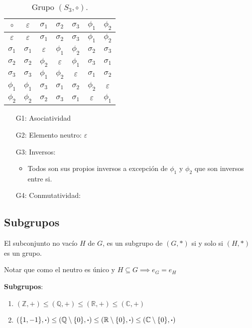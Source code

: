 \begin{table}[H]
	\centering
	\begin{tabular}{c|cccccc}
		$\circ$ & $\varepsilon$ & $\sigma_1$ & $\sigma_2$ & $\sigma_3$ & $\phi_1$ & $\phi_2$ \\ \hline
		$\varepsilon$ & $\varepsilon$ & $\sigma_1$ & $\sigma_2$ & $\sigma_3$ & $\phi_1$ & $\phi_2$ \\
		$\sigma_1$ & $\sigma_1$ & $\varepsilon$ & $\phi_1$ & $\phi_2$ & $\sigma_2$ & $\sigma_3$ \\
		$\sigma_2$ & $\sigma_2$ & $\phi_2$ & $\varepsilon$ & $\phi_1$ & $\sigma_3$ & $\sigma_1$\\
		$\sigma_3$ & $\sigma_3$ & $\phi_1$ & $\phi_2$ & $\varepsilon$ & $\sigma_1$ & $\sigma_2$\\
		$\phi_1$ & $\phi_1$ & $\sigma_3$ & $\sigma_1$ & $\sigma_2$ & $\phi_2$ & $\varepsilon$\\
		$\phi_2$ & $\phi_2$ & $\sigma_2$ & $\sigma_3$ & $\sigma_1$ & $\varepsilon$ & $\phi_1$\\
	\end{tabular}
	\caption{Grupo $(S_3, \circ)$.}
	\label{tab:compos}
\end{table}

\begin{itemize}
	\item[G1:] Asociatividad \cmark
	\item[G2:] Elemento neutro: $\varepsilon$ \cmark
	\item[G3:] Inversos: \cmark
	\begin{itemize}
		\item Todos son sus propios inversos a excepción de $\phi_1$ y $\phi_2$ que son inversos entre si.
	\end{itemize}
	\item[G4:] Conmutatividad: \xmark
\end{itemize}

\subsection{Subgrupos} \label{sec:subgrupo}
\vspace{3mm}	
	\begin{fmd-definition}[Subgrupo]
		El subconjunto no vacío $H$ de $G$, es un subgrupo de $(G, *)$ si y solo si $(H, *)$ es un grupo.
	\end{fmd-definition}
	Notar que como el neutro es único y $H \subseteq G \implies e_G = e_H$
	
	\textbf{Subgrupos}:
	\begin{enumerate}
		\item $(\mathbb{Z}, +) \le (\mathbb{Q}, +) \le (\mathbb{R}, +) \le (\mathbb{C}, +)$
		\item $\left( \{1, -1 \}, \boldsymbol{\cdot} \right) \le \left( \mathbb{Q} \setminus \{0\}, \boldsymbol{\cdot} \right) \le \left( \mathbb{R} \setminus \{0\}, \boldsymbol{\cdot} \right) \le \left( \mathbb{C} \setminus \{0\}, \boldsymbol{\cdot} \right)$
	\end{enumerate}
	
